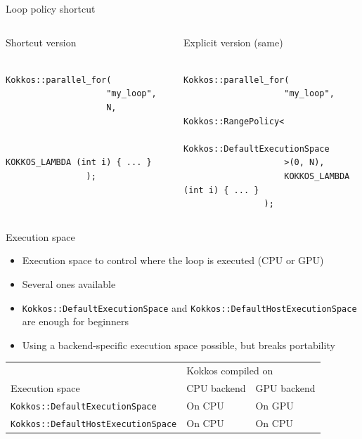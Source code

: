 \documentclass[aspectratio=169]{beamer}
\begin{document}
\begin{frame}[fragile]{Loop policy shortcut}
    \begin{columns}
        \begin{column}{0.48\linewidth}
            Shortcut version\strut

            \begin{verbatim}
                Kokkos::parallel_for(
                    "my_loop",
                    N,


                    KOKKOS_LAMBDA (int i) { ... }
                );
            \end{verbatim}
        \end{column}
        \begin{column}{0.52\linewidth}
            Explicit version (same)\strut

            \begin{verbatim}
                Kokkos::parallel_for(
                    "my_loop",
                    Kokkos::RangePolicy<
                        Kokkos::DefaultExecutionSpace
                    >(0, N),
                    KOKKOS_LAMBDA (int i) { ... }
                );
            \end{verbatim}
        \end{column}
    \end{columns}
\end{frame}


\begin{frame}{Execution space}
    \begin{itemize}
        \item Execution space to control where the loop is executed (CPU or GPU)
        \item Several ones available
        \item \texttt{Kokkos::DefaultExecutionSpace} and \texttt{Kokkos::DefaultHostExecutionSpace} are enough for beginners
        \item Using a backend-specific execution space possible, but breaks portability
    \end{itemize}
    \begin{center}
        \begin{tabular}{lll}
            & \multicolumn{2}{l}{Kokkos compiled on} \\
            Execution space & CPU backend & GPU backend \\
            \texttt{Kokkos::DefaultExecutionSpace} & On CPU & On GPU \\
            \texttt{Kokkos::DefaultHostExecutionSpace} & On CPU & On CPU \\
        \end{tabular}
    \end{center}
\end{frame}
\end{document}
